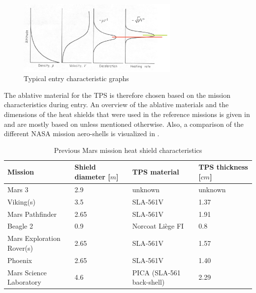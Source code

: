 \begin{figure}[!ht]
\centering
\includegraphics[width=0.7\textwidth]{figures/entry_descent/heatanddec_mooij2013entry.jpg}
\caption{Typical entry characteristic graphs \cite{mooij2013entry}}
\label{fig:heatanddec_mooij2013entry}
\end{figure}


The ablative material for the \acs{TPS} is therefore chosen based on the mission characteristics during entry. An overview of the ablative materials and the dimensions of the heat shields that were used in the reference missions is given in  and are mostly based on \cite{braun2006} unless mentioned otherwise. Also, a comparison of the different NASA mission aero-shells is visualized in .

\begin{table}[!ht]
\begin{center}
\caption{Previous Mars mission heat shield characteristics}
\label{tab:heatshieldchar}
\begin{tabular}{|l|l|l|l|}
\hline 
\textbf{Mission} 		& \textbf{Shield diameter [$m$]} & \textbf{\acs{TPS} material} & \textbf{\acs{TPS} thickness [$cm$]} \\ \hline \hline
Mars 3 		& 2.9 \cite{mars3_2014}& unknown & unknown \\ \hline %
Viking(s) 		& 3.5 & \acs{SLA}-561V & 1.37 \\ \hline
Mars Pathfinder 		& 2.65 & \acs{SLA}-561V & 1.91 \\ \hline
Beagle 2 		& 0.9 \cite{smith2002}& Norcoat Liège FI 
\cite{plotard2003}& 0.8 \cite{plotard2003}\\ \hline
Mars Exploration Rover(s) 		& 2.65 & \acs{SLA}-561V & 1.57 \\ \hline
Phoenix 		& 2.65 & \acs{SLA}-561V & 1.40 \\ \hline
Mars Science Laboratory 		& 4.6 & \acs{PICA} (\acs{SLA}-561 back-shell) \cite{blau2011}& 2.29 \\ \hline


\end{tabular}
\end{center}
\end{table}

